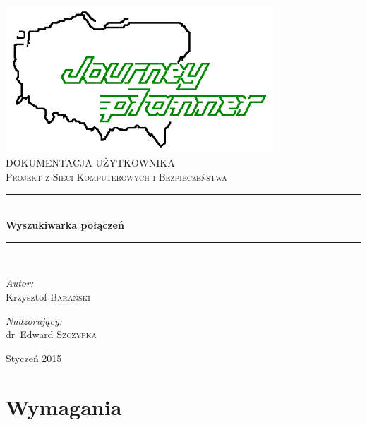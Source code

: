 \documentclass[pdftex,13pt,a4paper]{article}
\newcommand{\HRule}{\rule{\linewidth}{0.5mm}}
\begin{document}
\begin{titlepage}
\begin{center}

\includegraphics[width=0.75\textwidth]{../logo.png}~\\[2cm]

\textsc{\LARGE DOKUMENTACJA UŻYTKOWNIKA}\\[1.5cm]

\textsc{\Large Projekt z Sieci Komputerowych i Bezpieczeństwa}\\[0.5cm]

\HRule \\[0.4cm]
{ \huge \bfseries Wyszukiwarka połączeń \\[0.4cm] }

\HRule \\[1.5cm]

\begin{minipage}{0.4\textwidth}
\begin{flushleft} \large
\emph{Autor:}\\
Krzysztof \textsc{Barański}
\end{flushleft}
\end{minipage}
\begin{minipage}{0.4\textwidth}
\begin{flushright} \large
\emph{Nadzorujący:} \\
dr~Edward \textsc{Szczypka}
\end{flushright}
\end{minipage}

\vfill

{\large Styczeń 2015}

\end{center}
\end{titlepage}

\tableofcontents

\newpage

\section{Wymagania}
\end{document}
